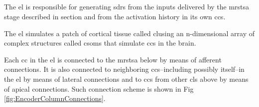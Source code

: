 \documentclass[11pt,a4paper]{article}
\begin{document}

\subsection*{}

The \gls{el} is responsible for generating \glspl{sdr} from the inputs delivered by the \gls{mrstsa} stage
described in section  and from the activation history in its own \glspl{cc}.

The \gls{el} simulates a patch of cortical tissue called \gls{cl}using an n-dimensional array of complex structures called \glspl{csom} that simulate \glspl{cc} in the brain.

Each \gls{cc} in the \gls{el} is connected to the \gls{mrstsa} below by means of afferent connections. It is also
connected to neighboring \glspl{cc}--including possibly itself--in the \gls{el} by means of lateral connections and
to \glspl{cc} from other \glspl{cl} above by means of apical connections. Such connection scheme is shown in Fig \ref{fig:EncoderColumnConnections}.
\end{document}
